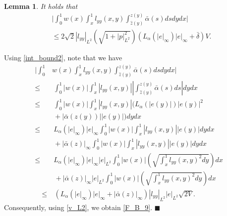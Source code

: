 \documentclass[twocolumn]{autart}
\newtheorem{lemm}{Lemma}
\newenvironment{lemma}{\begin{lemm}}{\hfill \end{lemm}}
\newenvironment{proof}{{\it Proof. }}{\hfill $\blacksquare$ }
\begin{document}
\begin{lemma}
It holds that 
\begin{align}
&\bigg|\int_{0}^{1}w(x)\int_{x}^{1}l_{yy}(x,y)\int_{\hat{z}(y)}^{z(y)}\bar{\alpha}(s)dsdydx\bigg| \nonumber \\
&\leq 2\sqrt{2}|l_{yy}|_{L^2}\left(\sqrt{1+|p|_{L^2}^2}\right) \left(L_{\alpha}(|e|_{\infty}) |e|_{\infty}+\bar{\delta} \right) V. \label{F_B_9}
\end{align}
\hfill  
\end{lemma}
\begin{proof}
Using \eqref{int_bound2}, note that we have 
\begin{align*}
\bigg|\int_{0}^{1}&w(x)\int_{x}^{1}l_{yy}(x,y)\int_{\hat{z}(y)}^{z(y)}\bar{\alpha}(s)dsdydx\bigg| \\
\leq&~ \int_{0}^{1}|w(x)|\int_{x}^{1}|l_{yy}(x,y)| \left|\int_{\hat{z}(y)}^{z(y)}\bar{\alpha}(s)ds\right|dydx\\
\leq&~ \int_{0}^{1}|w(x)|\int_{x}^{1}|l_{yy}(x,y)| \bigg(L_{\alpha}(|e(y)|) |e(y)|^2 \\
&~+|\bar{\alpha}(z(y))||e(y)|\bigg)dydx \\
\leq&~ L_{\alpha}(|e|_{\infty})|e|_{\infty}\int_{0}^{1}|w(x)|\int_{x}^{1}|l_{yy}(x,y)| |e(y)|dydx \\
&~+ |\bar{\alpha}(z)|_{\infty}\int_{0}^{1}|w(x)|\int_{x}^{1}|l_{yy}(x,y)| |e(y)|dydx \\
\leq&~ L_{\alpha}(|e|_{\infty}) |e|_{\infty}  |e|_{L^2}\int_{0}^{1}|w(x)|\left(\sqrt{\int_{x}^{1}l_{yy}(x,y)^2dy}\right)dx
\end{align*}
\begin{align*}
&~+|\bar{\alpha}(z)|_{\infty} |e|_{L^2}\int_{0}^{1}|w(x)| \left(\sqrt{\int_{x}^{1}l_{yy}(x,y)^2dy}\right)dx \\
\leq&~ \left(L_{\alpha}(|e|_{\infty}) |e|_{\infty}+|\bar{\alpha}(z)|_{\infty} \right)|l_{yy}|_{L^2}|e|_{L^2}\sqrt{2V}.
\end{align*}
Consequently, using \eqref{v_L2}, we obtain \eqref{F_B_9}. 
\end{proof}
\end{document}
